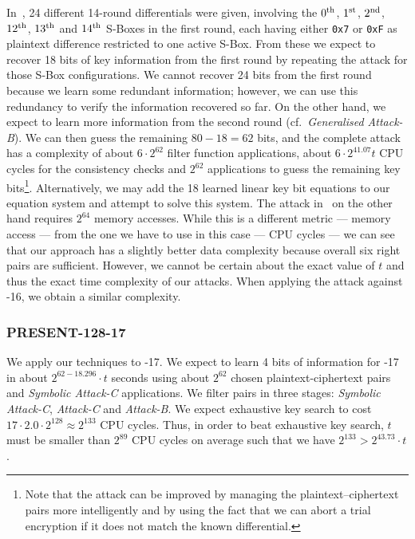 In~\cite{present-differentials}, 24 different 14-round differentials were given, involving the $0^{\textnormal{th}}$, $1^{\textnormal{st}}$, $2^{\textnormal{nd}}$, $12^{\textnormal{th}}$, $13^{\textnormal{th}}$ and $14^{\textnormal{th}}$ S-Boxes in the first round, each having either \texttt{0x7} or \texttt{0xF} as plaintext difference restricted to one active S-Box. From these we expect to recover 18 bits of key information from the first round by repeating the attack for those S-Box configurations. We cannot recover 24 bits from the first round because we learn some redundant information; however, we can use this redundancy to verify the information recovered so far. On the other hand, we expect to learn more information from the second round (cf.~\emph{Generalised Attack-B}). We can then guess the remaining $80-18 = 62$ bits, and the complete attack has a complexity of about $6  \cdot 2^{62}$ filter function applications, about $6 \cdot
2^{41.07} t$ CPU cycles for the consistency checks and $2^{62}$ \PRESENT applications to guess the remaining key bits\footnote{Note that the attack can be improved by managing the plaintext--ciphertext pairs more intelligently and by using the fact that we can abort a \PRESENT trial encryption if it does not match the known differential.}. Alternatively, we may add the 18 learned linear key bit equations to our equation system and attempt to solve this system. The attack in~\cite{present-dc:africacrypt} on the other hand requires $2^{64}$ memory accesses. While this is a different metric --- memory access --- from the one we have to use in this case --- CPU cycles --- we can see that our approach has a slightly better data complexity because overall six right
pairs are sufficient. However, we cannot be certain about the exact value of $t$ and thus the exact time complexity of our attacks. When applying the attack against -16, we obtain a similar complexity.

\subsubsection{PRESENT-128-17}
We apply our techniques to -17. We expect to learn 4 bits of information for -17 in about $2^{62 - 18.296} \cdot t$ seconds using about $2^{62}$ chosen plaintext-ciphertext pairs and \emph{Symbolic Attack-C} applications. We filter pairs in three stages: \emph{Symbolic Attack-C}, \emph{Attack-C} and \emph{Attack-B}. We expect exhaustive key search to cost $17 \cdot 2.0 \cdot 2^{128} \approx 2^{133}$ CPU cycles. Thus, in order to beat exhaustive key search, $t$ must be smaller than $2^{89}$ CPU cycles on average such that we have $2^{133} > 2^{43.73} \cdot t$.

